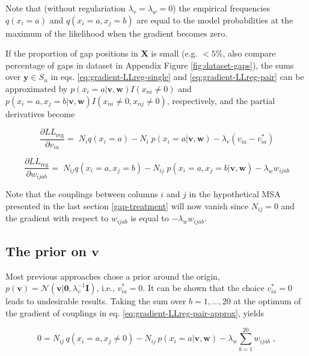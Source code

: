 \documentclass[11pt,a4paper,twoside]{book}
\newcommand{\eq}{\!=\!}
\newcommand{\Gauss}{\mathcal{N}}
\newcommand{\I}{\mathbf{I}}
\newcommand{\LLreg}{L\!L_\mathrm{reg}}
\newcommand{\Sn}{S_n}
\renewcommand{\v}{\mathbf{v}}
\newcommand{\via}{v_{ia}}
\newcommand{\w}{\mathbf{w}}
\newcommand{\wijab}{w_{ijab}}
\newcommand{\X}{\mathbf{X}}
\theoremstyle{definition}
\theoremstyle{definition}
\theoremstyle{remark}
\begin{document}
Note that (without regulariation \(\lambda_v = \lambda_w = 0\)) the
empirical frequencies \(q(x_i \eq a)\) and \(q(x_i \eq a, x_j=b)\) are
equal to the model probabilities at the maximum of the likelihood when
the gradient becomes zero.

If the proportion of gap positions in \(\X\) is small (e.g. \(<5\%\),
also compare percentage of gaps in dataset in Appendix Figure
\ref{fig:dataset-gaps}), the sums over \(\mathbf{y} \in \Sn\) in eqs.
\eqref{eq:gradient-LLreg-single} and \eqref{eq:gradient-LLreg-pair} can be
approximated by \(p(x_i=a | \v,\w) I(x_{ni} \ne 0)\) and
\(p(x_i=a, x_j=b | \v,\w) I(x_{ni} \ne 0, x_{nj} \ne 0)\), respectively,
and the partial derivatives become

\begin{equation}
  \frac{\partial \LLreg}{\partial \via}   = \; N_i q(x_i \eq a) -  N_i \; p(x_i \eq a  | \v,\w)  - \lambda_v (\via - \via^*)
\label{eq:gradient-LLreg-single-approx}
\end{equation}

\begin{equation}
  \frac{\partial \LLreg}{\partial \wijab} = \; N_{ij} q(x_i \eq a, x_j=b) - N_{ij} \; p(x_i \eq a, x_j \eq b | \v,\w) - \lambda_w \wijab
\label{eq:gradient-LLreg-pair-approx}
\end{equation}

Note that the couplings between columns \(i\) and \(j\) in the
hypothetical MSA presented in the last section \ref{gap-treatment} will
now vanish since \(N_{ij} \eq 0\) and the gradient with respect to
\(\wijab\) is equal to \(-\lambda_w \wijab\).

\subsection{\texorpdfstring{The prior on
\(\v\)}{The prior on \textbackslash{}v}}\label{prior-v}

Most previous approaches chose a prior around the origin,
\(p(\v) = \Gauss ( \v| \mathbf{0}, \lambda_v^{-1} \I)\), i.e.,
\(\via^* \eq 0\). It can be shown that the choice \(\via^* \eq 0\) leads
to undesirable results. Taking the sum over \(b=1,\ldots, 20\) at the
optimum of the gradient of couplings in eq.
\eqref{eq:gradient-LLreg-pair-approx}, yields

\begin{equation}
    0 =   N_{ij}\, q(x_i \eq a, x_j \ne 0)   - N_{ij}\, p(x_i \eq a | \v, \w)  - \lambda_w \sum_{b=1}^{20} \wijab \; ,
    \label{eq:sum-over-b-at-optimum}
\end{equation}
\end{document}
